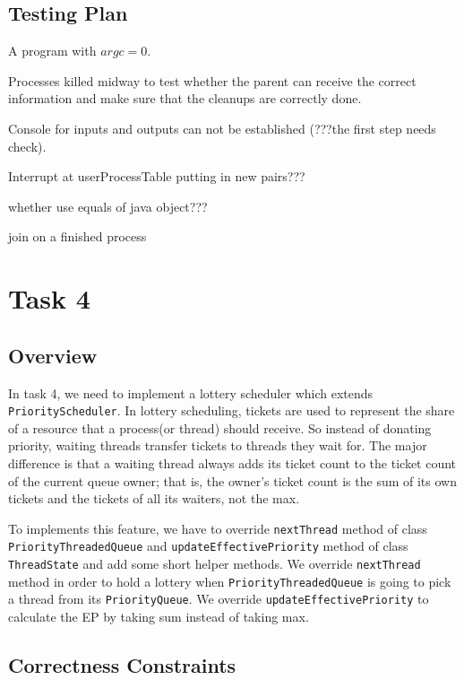 \documentclass{article}
\begin{document}
\begin{spacing}{1.1}
\subsection{Testing Plan}
\begin{asparaitem}
  \item A program with $argc=0$.
  \item Processes killed midway to test whether the parent can receive the correct information and make sure that the cleanups are correctly done.
  \item Console for inputs and outputs can not be established (???the first step needs check).
  \item Interrupt at userProcessTable putting in new pairs???
  \item whether use equals of java object???
  \item join on a finished process
\end{asparaitem}


\section{Task 4}

\subsection{Overview}
In task 4, we need to implement a lottery scheduler which extends \texttt{PriorityScheduler}. In lottery scheduling, tickets are used to represent the share of a resource that a process(or thread) should receive. So instead of donating priority, waiting threads transfer tickets to threads they wait for. The major difference is that a waiting thread always adds its ticket count to the ticket count of the current queue owner; that is, the owner's ticket count is the sum of its own tickets and the tickets of all its waiters, not the max.

To implements this feature, we have to override \texttt{nextThread} method of class \texttt{PriorityThreadedQueue} and \texttt{updateEffectivePriority} method of class \texttt{ThreadState} and add some short helper methods. We override \texttt{nextThread} method in order to hold a lottery when \texttt{PriorityThreadedQueue} is going to pick a thread from its \texttt{PriorityQueue}. We override \texttt{updateEffectivePriority} to calculate the EP by taking sum instead of taking max.

\subsection{Correctness Constraints}


\end{spacing}
\end{document}
